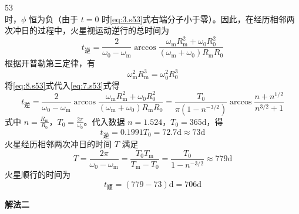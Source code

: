 \begin{solution}{53}
\begin{equation}
\label{eq:6.s53}
\end{equation}
时，$\phi$ 恒为负（由于 $t = 0$ 时\eqref{eq:3.s53}式右端分子小于零）。因此，在经历相邻两次冲日的过程中，火星视运动逆行的总时间为
\begin{equation}
t_{\text{逆}} = \frac{2}{\omega_{0}-\omega_{\mathrm{m}}}\arccos\frac{\omega_{\mathrm{m}}R_{\mathrm{m}}^{2}+\omega_{0}R_{0}^{2}}{(\omega_{\mathrm{m}}+\omega_{0})R_{\mathrm{m}}R_{0}}
\label{eq:7.s53}
\end{equation}
根据开普勒第三定律，有
\begin{equation}
\omega_{\mathrm{m}}^{2}R_{\mathrm{m}}^{3} = \omega_{0}^{2}R_{0}^{3}
\label{eq:8.s53}
\end{equation}
将\eqref{eq:8.s53}式代入\eqref{eq:7.s53}式得
\begin{equation}
t_{\text{逆}} = \frac{2}{\omega_{0}-\omega_{\mathrm{m}}}\arccos\frac{\omega_{\mathrm{m}}R_{\mathrm{m}}^{2}+\omega_{0}R_{0}^{2}}{(\omega_{\mathrm{m}}+\omega_{0})R_{\mathrm{m}}R_{0}} = \frac{T_{0}}{\pi(1-n^{-3/2})}\arccos\frac{n+n^{1/2}}{n^{3/2}+1}
\label{eq:9.s53}
\end{equation}
式中 $n = \frac{R_{\mathrm{m}}}{R_0}$，$T_{0} = \frac{2\pi}{\omega_{0}}$。代入数据 $n = 1.524$，$T_{0} = 365\mathrm{d}$，得
\begin{equation}
t_{\text{逆}} = 0.1991T_{0} = 72.7\mathrm{d} \approx 73\mathrm{d}
\label{eq:10.s53}
\end{equation}
火星经历相邻两次冲日的时间 $T$ 满足
\begin{equation}
T = \frac{2\pi}{\omega_{0}-\omega_{\mathrm{m}}} = \frac{T_{0}T_{\mathrm{m}}}{T_{\mathrm{m}}-T_{0}} = \frac{T_{0}}{1-n^{-3/2}} \approx 779\mathrm{d}
\label{eq:11.s53}
\end{equation}
火星顺行的时间为
\begin{equation}
t_{\text{顺}} = (779 - 73)\mathrm{d} = 706\mathrm{d}
\label{eq:12.s53}
\end{equation}

\textbf{解法二}


\end{solution}

